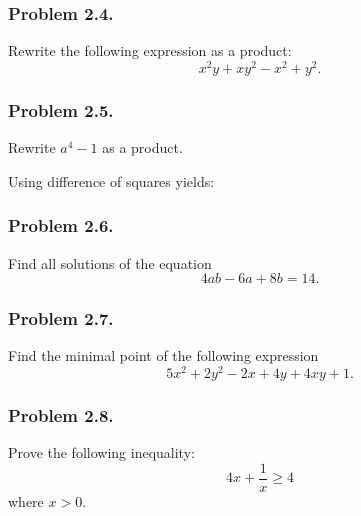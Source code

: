 \documentclass{article}
\begin{document}
\subsubsection{Problem 2.4.}
Rewrite the following expression as a product:
\begin{equation}
    x^2y+xy^2-x^2+y^2.
\end{equation}

\subsubsection{Problem 2.5.}
Rewrite $a^4 - 1$ as a product.

Using difference of squares yields:

\subsubsection{Problem 2.6.}
Find all solutions of the equation
\begin{equation}
    4ab-6a+8b = 14.
\end{equation}

\subsubsection{Problem 2.7.}
Find the minimal point of the following expression
\[
5x^2 + 2y^2 -2x +4y + 4xy + 1.
\]

\subsubsection{Problem 2.8.}
Prove the following inequality:
\[
4x+\frac{1}{x} \ge 4
\]
where $x > 0$.
\end{document}
